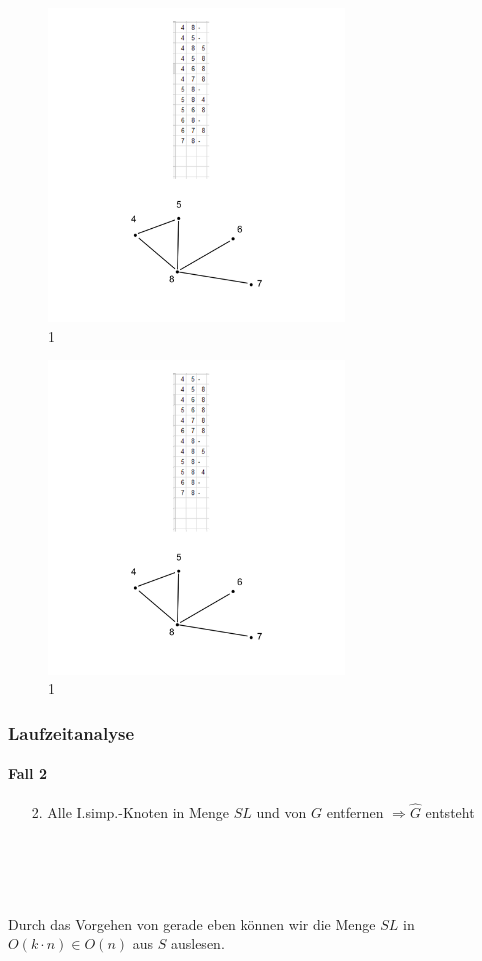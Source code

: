 \begin{frame}[t]
\begin{figure}[htbp] 
	\includegraphics[width=0.7\textwidth]{images/3.png}
	\caption{1}
	\label{fig:Bild1}
\end{figure}
\end{frame}


\begin{frame}[t]
\begin{figure}[htbp] 
	\includegraphics[width=0.7\textwidth]{images/4.png}
	\caption{1}
	\label{fig:Bild1}
\end{figure}
\end{frame}


\begin{frame}
\frametitle{Laufzeitanalyse}
\framesubtitle{Fall 2}

\begin{enumerate}
	\item[2.] Alle I.simp.-Knoten in Menge $SL$ und von $G$ entfernen $\Rightarrow \widehat{G}$ entsteht
\end{enumerate}
\ \\
\ \\
\ \\
\ \\
Durch das Vorgehen von gerade eben können wir die Menge $SL$ in $O(k \cdot n) \in O(n)$ aus $S$ auslesen.

\end{frame}


